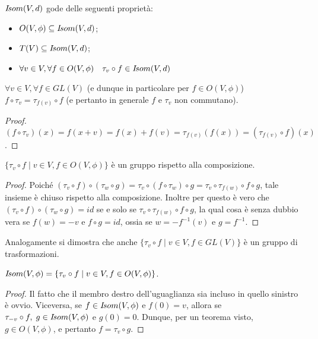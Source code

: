  \begin{remark} $I\!som( V,d)$ gode delle seguenti proprietà:
 \begin{itemize}
	\item $O(V,\phi)\subseteq I\!som( V,d)$;
	\item $T(V)\subseteq I\!som( V,d)$;
	\item $\forall v\in V,\forall f\in O(V,\phi)\quad\tau_v\circ f\in I\!som( V,d)$
 \end{itemize}
 \end{remark}
 
 \begin{lemma}
 $\forall v\in V, \forall f\in GL(V)$ (e dunque in particolare per 
 $f\in O(V,\phi)$) $f\circ\tau_v=\tau_{f(v)}\circ f$ (e pertanto in generale $f$ e $\tau_v$ non commutano).
 \end{lemma}
 
 \begin{proof}
 $(f\circ\tau_v)(x)=f(x+v)=f(x)+f(v)=\tau_{f(v)}(f(x))=(\tau_{f(v)}\circ f)(x)$.
  \end{proof}
 
 \begin{proposition}
 $\{\tau_v\circ f\;|\;v\in V,f\in O(V,\phi)\}$ è un gruppo rispetto alla composizione.
 \end{proposition}
 
 \begin{proof}
 Poiché  $(\tau_v\circ f)\circ(\tau_w\circ g)=\tau_v\circ(f\circ\tau_w)\circ g=
 \tau_v\circ\tau_{f(w)}\circ f\circ g$, tale insieme è chiuso rispetto alla composizione.
 Inoltre per questo è vero che $(\tau_v\circ f)\circ(\tau_w\circ g)=id$ se e solo se $\tau_v\circ\tau_{f(w)}\circ f\circ g$,
 la qual cosa è senza dubbio vera se $f(w)=-v$  e  $f\circ g=id$, ossia se $w=-f^{-1}(v)$  e 
 $g=f^{-1}$.
  \end{proof}
 
 \begin{remark}\label{oss:gruppoaff}
 Analogamente si dimostra che anche $\{\tau_v\circ f\;|\;v\in V,f\in GL(V)\}$ 
 è un gruppo di trasformazioni.
 \end{remark}
 
 \begin{theorem}
 \label{thm:isometrie}
 $I\!som( V,\phi)=\{\tau_v\circ f\;|\;v\in V,f\in O(V,\phi)\}$.
 \end{theorem}
 
 \begin{proof}
 Il fatto che il membro destro dell'uguaglianza sia incluso in quello sinistro è ovvio.
 Viceversa, se $f\in I\!som( V,\phi)$  e  $f(0)=v$, allora se  $\tau_{-v}\circ f,\; g\in I\!som( V,\phi)$ e
 $g(0)=0$. Dunque, per un teorema visto, $g\in O(V,\phi)$, e pertanto $f=\tau_v\circ g$.
  \end{proof}
 

